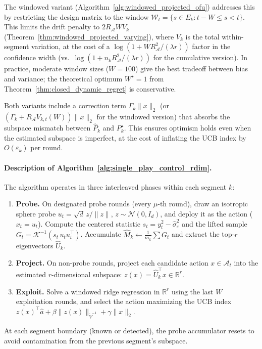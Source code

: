 \documentclass{article}
\newcommand{\R}{\mathbb{R}}
\newcommand{\cA}{\mathcal{A}}
\begin{document}
  The windowed variant (Algorithm~\ref{alg:windowed_projected_ofu}) addresses this
  by restricting the design matrix to the window
  $\mathcal W_t = \{s \in E_k : t{-}W \le s < t\}$.
  This limits the drift penalty to $2R_{\cA} W V_k$ (Theorem~\ref{thm:windowed_projected_varying}),
  where $V_k$ is the total within-segment variation, at the cost of a
  $\log(1 + WR_{\cA}^2/(\lambda r))$ factor in the confidence width (vs.\
  $\log(1 + n_k R_{\cA}^2/(\lambda r))$ for the cumulative version).
  In practice, moderate window sizes ($W = 100$) give the best tradeoff
  between bias and variance; the theoretical optimum $W^\star = 1$ from
  Theorem~\ref{thm:closed_dynamic_regret} is conservative.

  Both variants include a correction term $\Gamma_k \|x\|_2$ (or
  $(\Gamma_k + R_{\cA} V_{k,t}(W))\|x\|_2$ for the windowed version) that absorbs
  the subspace mismatch between $\widehat P_k$ and $P_k^\star$.
  This ensures optimism holds even when the estimated subspace is imperfect,
  at the cost of inflating the UCB index by $O(\varepsilon_k)$ per round.


\paragraph{Description of Algorithm~\ref{alg:single_play_control_rdim}.}
The algorithm operates in three interleaved phases within each segment $k$:
\begin{enumerate}[nosep,leftmargin=2em]
  \item \textbf{Probe.} On designated probe rounds (every $\mu$-th round), draw an isotropic sphere probe $u_t = \sqrt{d}\,z/\|z\|$, $z \sim \mathcal{N}(0,I_d)$, and deploy it as the action ($x_t = u_t$). Compute the centered statistic $s_t = y_t^2 - \hat\sigma_\varepsilon^2$ and the lifted sample $G_t = \mathcal{K}^{-1}(s_t\,u_t u_t^\top)$. Accumulate $\widehat M_k \leftarrow \tfrac{1}{m_k}\sum G_t$ and extract the top-$r$ eigenvectors $\widehat U_k$.
  \item \textbf{Project.} On non-probe rounds, project each candidate action $x \in \cA_t$ into the estimated $r$-dimensional subspace: $z(x) = \widehat U_k^\top x \in \R^r$.
  \item \textbf{Exploit.} Solve a windowed ridge regression in $\R^r$ using the last $W$ exploitation rounds, and select the action maximizing the UCB index $z(x)^\top \hat a + \beta \|z(x)\|_{\widetilde V^{-1}} + \gamma \|x\|_2$.
\end{enumerate}
At each segment boundary (known or detected), the probe accumulator resets to avoid contamination from the previous segment's subspace.
\end{document}
